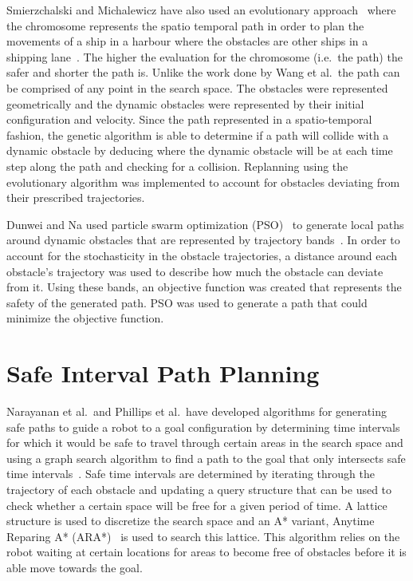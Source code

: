 Smierzchalski and Michalewicz have also used an evolutionary
approach~\cite{evosurvey} where the chromosome represents the spatio temporal
path in order to plan the movements of a ship in a harbour where the obstacles
are other ships in a shipping lane~\cite{smierzchalski2005path}.  The higher
the evaluation for the chromosome (i.e.\ the path) the safer and shorter the
path is. Unlike the work done by Wang et al.\ the path can be comprised of any
point in the search space.  The obstacles were represented geometrically and
the dynamic obstacles were represented by their initial configuration and
velocity.  Since the path represented in a spatio-temporal fashion, the genetic
algorithm is able to determine if a path will collide with a dynamic obstacle
by deducing where the dynamic obstacle will be at each time step along the path
and checking for a collision.  Replanning using the evolutionary algorithm was
implemented to account for obstacles deviating from their prescribed
trajectories.

Dunwei and Na used particle swarm optimization (PSO)~\cite{kennedy2010particle}
to generate local paths around dynamic obstacles that are represented by
trajectory bands~\cite{dunwei2011local}.  In order to account for the
stochasticity in the obstacle trajectories, a distance around each obstacle's
trajectory was used to describe how much the obstacle can deviate from it.
Using these bands, an objective function was created that represents the safety
of the generated path. PSO was used to generate a path that could minimize the
objective function.

\section{Safe Interval Path Planning}

Narayanan et al.\ and Phillips et al.\ have developed algorithms for generating
safe paths to guide a robot to a goal configuration by determining time
intervals for which it would be safe to travel through certain areas in the
search space and using a graph search algorithm to find a path to the goal that
only intersects safe time intervals~\cite{asipp, sipp}.  Safe time intervals
are determined by iterating through the trajectory of each obstacle and
updating a query structure that can be used to check whether a certain space
will be free for a given period of time. A lattice structure is used to
discretize the search space and an A* variant, Anytime Reparing A*
(ARA*)~\cite{likhachev2003ara} is used to search this lattice. This algorithm
relies on the robot waiting at certain locations for areas to become free of
obstacles before it is able move towards the goal.

